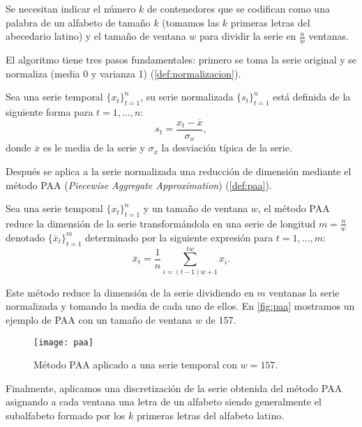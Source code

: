 Se necesitan indicar el número $k$ de contenedores que se codifican como una palabra de un alfabeto de tamaño $k$ (tomamos las $k$ primeras letras del abecedario latino) y el tamaño de ventana $w$ para dividir la serie en $\frac{n}{w}$ ventanas.

El algoritmo tiene tres pasos fundamentales: primero se toma la serie original y se normaliza (media 0 y varianza 1) (\autoref{def:normalizacion}).

\begin{definicion}[Normalización]
  Sea una serie temporal $\{x_t\}_{t = 1}^n$, su serie normalizada $\{s_t\}_{t = 1}^n$ está definida de la siguiente forma para $t = 1, \ldots, n$:
  $$s_t = \dfrac{x_t - \overline{x}}{\sigma_x},$$
  donde $\overline{x}$ es le media de la serie y $\sigma_x$ la desviación típica de la serie.
  \label{def:normalizacion}
\end{definicion}

Después se aplica a la serie normalizada una reducción de dimensión mediante el método PAA (\emph{Piecewise Aggregate Approximation}) \cite{keogh2001dimensionality} (\autoref{def:paa}).

\begin{definicion}[PAA]
  Sea una serie temporal $\{x_t\}_{t = 1}^n$ y un tamaño de ventana $w$, el método PAA reduce la dimensión de la serie transformándola en una serie de longitud $m = \frac{n}{w}$ denotado $\{\overline{x}_t\}_{t = 1}^m$ determinado por la siguiente expresión para $t = 1, \ldots, m$:
  $$\overline{x}_t = \dfrac{1}{n} \sum \limits_{i = (t-1)w + 1}^{tw} x_i.$$
  \label{def:paa}
\end{definicion}

Este método reduce la dimensión de la serie dividiendo en $m$ ventanas la serie normalizada y tomando la media de cada uno de ellos. En \autoref{fig:paa} mostramos un ejemplo de PAA con un tamaño de ventana $w$ de 157.

\begin{figure}[htpb]
  \centering
  \texttt{[image: paa]}
  \caption{Método PAA aplicado a una serie temporal con $w = 157$.}
  \label{fig:paa}
\end{figure}

Finalmente, aplicamos una discretización de la serie obtenida del método PAA asignando a cada ventana una letra de un alfabeto siendo generalmente el subalfabeto formado por los $k$ primeras letras del alfabeto latino.

